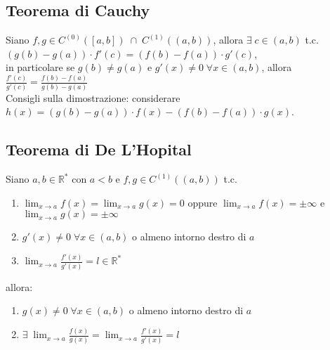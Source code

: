 \documentclass[a4paper]{article}
\newcommand\cont[2]{C^{(#1)} \left({#2}\right)}
\begin{document}
\subsection{Teorema di Cauchy}
Siano \(f, g \in \cont{0}{\left[a, b\right]} \; \cap \; \cont{1}{\left(a, b\right)}\), allora \(\exists \; c \in \left(a, b\right)\) t.c. \(\left(g(b) - g(a)\right) \cdot f'(c) = \left(f(b) - f(a)\right) \cdot g'(c)\), \\
in particolare se \(g(b) \neq g(a)\) e \(g'(x) \neq 0 \; \forall x \in \left(a, b\right)\), allora \(\displaystyle \frac{f'(c)}{g'(c)} = \frac{f(b) - f(a)}{g(b) - g(a)}\) \\
Consigli sulla dimostrazione: considerare \(h(x) = \left(g(b) - g(a)\right) \cdot f(x) - \left(f(b) - f(a)\right) \cdot g(x)\).

\subsection{Teorema di De L'Hopital}
Siano \(a, b \in \mathbb{R}^*\) con \(a < b\) e \(f, g \in \cont{1}{\left(a, b\right)}\) t.c.
\begin{enumerate} [topsep=3pt, itemsep=0pt]
	\item \(\displaystyle \lim_{x \to a} f(x) = \lim_{x \to a} g(x) = 0\) oppure \(\displaystyle \lim_{x \to a} f(x) = \pm \infty\) e \(\displaystyle \lim_{x \to a} g(x) = \pm \infty\)
	\item \(g'(x) \neq 0 \; \forall x \in \left(a, b\right)\) o almeno intorno destro di \(a\)
	\item \(\displaystyle \lim_{x \to a} \frac{f'(x)}{g'(x)} = l \in \mathbb{R}^*\)
\end{enumerate}
allora:
\begin{enumerate} [topsep=3pt, itemsep=0pt]
	\item \(g(x) \neq 0 \; \forall x \in \left(a, b\right)\) o almeno intorno destro di \(a\)
	\item \(\displaystyle \exists \; \lim_{x \to a} \frac{f(x)}{g(x)} = \lim_{x \to a} \frac{f'(x)}{g'(x)} = l\)
\end{enumerate}
\end{document}
